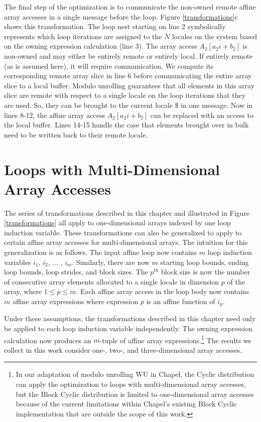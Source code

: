 The final step of the optimization is to communicate the non-owned remote affine array accesses in a single message before the loop. Figure \ref{transformations}c shows this transformation. The loop nest starting on line 2 symbolically represents which loop iterations are assigned to the $N$ locales on the system based on the owning expression calculation (line 3). The array access $A_{2}[a_{2}i+b_{2}]$ is non-owned and may either be entirely remote or entirely local. If entirely remote (as is assumed here), it will require communication. We compute its corresponding remote array slice in line 6 before communicating the entire array slice to a local buffer. Modulo unrolling guarantees that all elements in this array slice are remote with respect to a single locale on the loop iterations that they are used. So, they can be brought to the current locale \$ in one message. Now in lines 8-12, the affine array access $A_{2}[a_{2}i+b_{2}]$ can be replaced with an access to the local buffer. Lines 14-15 handle the case that elements brought over in bulk need to be written back to their remote locale. 

\section{Loops with Multi-Dimensional Array Accesses}\label{sec:multi_dimensional}

The series of transformations described in this chapter and illustrated in Figure \ref{transformations} all apply to one-dimensional arrays indexed by one loop induction variable. These transformations can also be generalized to apply to certain affine array accesses for multi-dimensional arrays. The intuition for this generalization is as follows. The input affine loop now contains $m$ loop induction variables $i_{1}$, $i_{2}$, ... , $i_{m}$. Similarly, there are now $m$ starting loop bounds, ending loop bounds, loop strides, and block sizes. The $p^{th}$ block size is now the number of consecutive array elements allocated to a single locale in dimension $p$ of the array, where $1 \le p \le m$. Each affine array access in the loop body now contains $m$ affine array expressions where expression $p$ is an affine function of $i_{p}$. 

Under these assumptions, the transformations described in this chapter need only be applied to each loop induction variable independently. The owning expression calculation now produces an $m$-tuple of affine array expressions.\footnote{In our adaptation of modulo unrolling WU in Chapel, the Cyclic distribution can apply the optimization to loops with multi-dimensional array accesses, but the Block Cyclic distribution is limited to one-dimensional array accesses because of the current limitations within Chapel's existing Block Cyclic implementation that are outside the scope of this work. } The results we collect in this work consider one-, two-, and three-dimensional array accesses. 